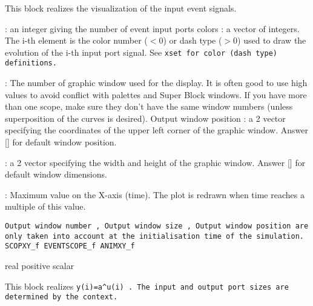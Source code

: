 This block realizes the visualization of  the input event signals.
\begin{scitem}
\item[{\verb?Number of event inputs?}]
: an integer giving the number of event input ports
colors
: a vector of integers. The i-th element is the color number ($<$0)
or dash type ($>$0) used to draw the evolution of the i-th 
input port signal. See %
\tt xset %
\rm for color (dash type) definitions.
\item[{\verb?Output window number?}]
: The number of graphic window used for the display. It is often good
to use high values to avoid conflict with palettes and Super Block
windows. If you have more than one scope, make sure they don't have
the same window numbers (unless superposition of the curves is
desired).
Output window position
: a 2 vector specifying the coordinates of the upper left corner of
the graphic window. Answer [] for default window position.
\item[{\verb?Output window size?}]
: a 2 vector specifying the width and height  of 
the graphic window. Answer [] for default window dimensions.
\item[{\verb?Refresh period?}]
: Maximum value on the X-axis (time). The plot is redrawn when time
reaches a multiple of this value.
\end{scitem}%
%
\tt Output window number%
\rm , %
\tt Output window size%
\rm , %
\tt Output window
position %
\rm are only taken into account at the initialisation time of the
simulation. 
{\verb?SCOPXY_f EVENTSCOPE_f ANIMXY_f?} \pageref{SCOPXYfEVENTSCOPEfANIMXYf}




%
%


\label{EXPBLKf}

\begin{scitem}
\item[{\verb?a :?}]
real positive scalar
\end{scitem}%
This block realizes %
\tt y(i)=a\^{}u(i)%
\rm . The input and output port sizes
are determined by the context.






%
%


